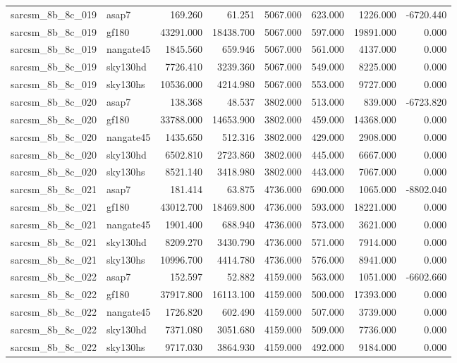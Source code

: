 \begin{tabular}{llrrrrrr}
sarcsm\_8b\_8c\_019 & asap7 & 169.260 & 61.251 & 5067.000 & 623.000 & 1226.000 & -6720.440 \\
sarcsm\_8b\_8c\_019 & gf180 & 43291.000 & 18438.700 & 5067.000 & 597.000 & 19891.000 & 0.000 \\
sarcsm\_8b\_8c\_019 & nangate45 & 1845.560 & 659.946 & 5067.000 & 561.000 & 4137.000 & 0.000 \\
sarcsm\_8b\_8c\_019 & sky130hd & 7726.410 & 3239.360 & 5067.000 & 549.000 & 8225.000 & 0.000 \\
sarcsm\_8b\_8c\_019 & sky130hs & 10536.000 & 4214.980 & 5067.000 & 553.000 & 9727.000 & 0.000 \\
sarcsm\_8b\_8c\_020 & asap7 & 138.368 & 48.537 & 3802.000 & 513.000 & 839.000 & -6723.820 \\
sarcsm\_8b\_8c\_020 & gf180 & 33788.000 & 14653.900 & 3802.000 & 459.000 & 14368.000 & 0.000 \\
sarcsm\_8b\_8c\_020 & nangate45 & 1435.650 & 512.316 & 3802.000 & 429.000 & 2908.000 & 0.000 \\
sarcsm\_8b\_8c\_020 & sky130hd & 6502.810 & 2723.860 & 3802.000 & 445.000 & 6667.000 & 0.000 \\
sarcsm\_8b\_8c\_020 & sky130hs & 8521.140 & 3418.980 & 3802.000 & 443.000 & 7067.000 & 0.000 \\
sarcsm\_8b\_8c\_021 & asap7 & 181.414 & 63.875 & 4736.000 & 690.000 & 1065.000 & -8802.040 \\
sarcsm\_8b\_8c\_021 & gf180 & 43012.700 & 18469.800 & 4736.000 & 593.000 & 18221.000 & 0.000 \\
sarcsm\_8b\_8c\_021 & nangate45 & 1901.400 & 688.940 & 4736.000 & 573.000 & 3621.000 & 0.000 \\
sarcsm\_8b\_8c\_021 & sky130hd & 8209.270 & 3430.790 & 4736.000 & 571.000 & 7914.000 & 0.000 \\
sarcsm\_8b\_8c\_021 & sky130hs & 10996.700 & 4414.780 & 4736.000 & 576.000 & 8941.000 & 0.000 \\
sarcsm\_8b\_8c\_022 & asap7 & 152.597 & 52.882 & 4159.000 & 563.000 & 1051.000 & -6602.660 \\
sarcsm\_8b\_8c\_022 & gf180 & 37917.800 & 16113.100 & 4159.000 & 500.000 & 17393.000 & 0.000 \\
sarcsm\_8b\_8c\_022 & nangate45 & 1726.820 & 602.490 & 4159.000 & 507.000 & 3739.000 & 0.000 \\
sarcsm\_8b\_8c\_022 & sky130hd & 7371.080 & 3051.680 & 4159.000 & 509.000 & 7736.000 & 0.000 \\
sarcsm\_8b\_8c\_022 & sky130hs & 9717.030 & 3864.930 & 4159.000 & 492.000 & 9184.000 & 0.000 \\

\end{tabular}
